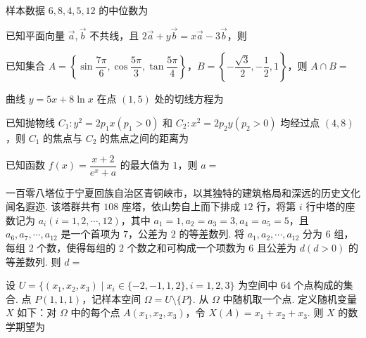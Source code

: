 \documentclass[a4paper,11pt]{report}
\begin{document}
\begin{examquestions}
\item 样本数据 $6,8,4,5,12$ 的中位数为

\item 已知平面向量 $\vec a,\vec b$ 不共线，且 $2\vec a+y\vec b=x\vec a-3\vec b$，则

\item 已知集合 $A=\left\{\sin\dfrac{7\pi}{6},\cos\dfrac{5\pi}{3},\tan\dfrac{5\pi}{4}\right\}$，$B=\left\{-\dfrac{\sqrt3}{2},-\dfrac12,1\right\}$，则 $A\cap B=$
\fourchoices
{}
{}
{}
{}

\item 曲线 $y=5x+8\ln x$ 在点 $(1,5)$ 处的切线方程为

\item 已知抛物线 $C_1:y^2=2p_1x(p_1>0)$ 和 $C_2:x^2=2p_2y(p_2>0)$ 均经过点 $(4,8)$，则 $C_1$ 的焦点与 $C_2$ 的焦点之间的距离为

\item 已知函数 $f(x)=\dfrac{x+2}{e^x+a}$ 的最大值为 $1$，则 $a=$
\newpage
\item 一百零八塔位于宁夏回族自治区青铜峡市，以其独特的建筑格局和深远的历史文化闻名遐迩. 该塔群共有 $108$ 座塔，依山势自上而下排成 $12$ 行，将第 $i$ 行中塔的座数记为 $a_i(i=1,2,\cdots,12)$，其中 $a_1=1,a_2=a_3=3,a_4=a_5=5$，且 $a_6,a_7,\cdots,a_{12}$ 是一个首项为 $7$，公差为 $2$ 的等差数列. 将 $a_1,a_2,\cdots,a_{12}$ 分为 $6$ 组，每组 $2$ 个数，使得每组的 $2$ 个数之和可构成一个项数为 $6$ 且公差为 $d(d>0)$ 的等差数列. 则 $d=$

\item 设 $U=\{(x_1,x_2,x_3)\mid x_i\in\{-2,-1,1,2\},i=1,2,3\}$ 为空间中 $64$ 个点构成的集合. 点 $P(1,1,1)$，记样本空间 $\Omega=U\setminus\{P\}$. 从 $\Omega$ 中随机取一个点. 定义随机变量 $X$ 如下：对 $\Omega$ 中的每个点 $A(x_1,x_2,x_3)$，令 $X(A)=x_1+x_2+x_3$. 则 $X$ 的数学期望为
\end{examquestions}
\end{document}
